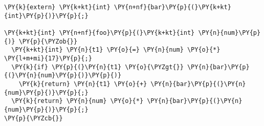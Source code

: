 \begin{Verbatim}[commandchars=\\\{\}]
\PY{k}{extern} \PY{k+kt}{int} \PY{n+nf}{bar}\PY{p}{(}\PY{k+kt}{int}\PY{p}{)}\PY{p}{;}

\PY{k+kt}{int} \PY{n+nf}{foo}\PY{p}{(}\PY{k+kt}{int} \PY{n}{num}\PY{p}{)} \PY{p}{\PYZob{}}
  \PY{k+kt}{int} \PY{n}{t1} \PY{o}{=} \PY{n}{num} \PY{o}{*} \PY{l+m+mi}{17}\PY{p}{;}
  \PY{k}{if} \PY{p}{(}\PY{n}{t1} \PY{o}{\PYZgt{}} \PY{n}{bar}\PY{p}{(}\PY{n}{num}\PY{p}{)}\PY{p}{)}
    \PY{k}{return} \PY{n}{t1} \PY{o}{+} \PY{n}{bar}\PY{p}{(}\PY{n}{num}\PY{p}{)}\PY{p}{;}
  \PY{k}{return} \PY{n}{num} \PY{o}{*} \PY{n}{bar}\PY{p}{(}\PY{n}{num}\PY{p}{)}\PY{p}{;}
\PY{p}{\PYZcb{}}
\end{Verbatim}
